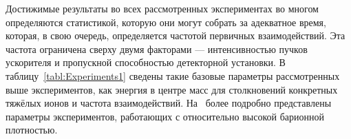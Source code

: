 
\bigskip


Достижимые результаты во всех рассмотренных экспериментах во многом определяются статистикой, которую они могут собрать за адекватное время, которая, в свою очередь, определяется частотой первичных взаимодействий. Эта частота ограничена сверху двумя факторами --- интенсивностью пучков ускорителя и пропускной способностью детекторной установки. В таблицу~\ref{tabl:Experiments1} сведены такие базовые параметры рассмотренных выше экспериментов, как энергия в центре масс для столкновений конкретных тяжёлых ионов и частота взаимодействий. На~ более подробно представлены параметры экспериментов, работающих с относительно высокой барионной плотностью.


